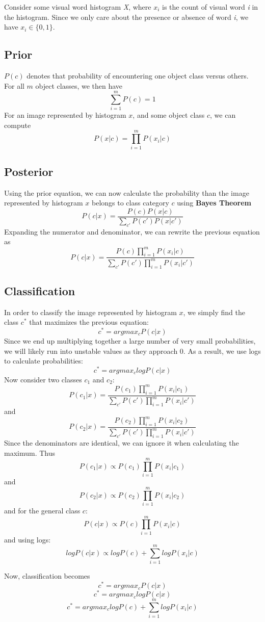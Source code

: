 \documentclass{article}
\begin{document}
Consider some visual word histogram \textit{X}, where $x_i$ is the count of visual word \textit{i} in the histogram. Since we only care about the presence or absence of word \textit{i}, we have $x_i \in \{0,1\}$.  
\subsection{Prior}
$P(c)$ denotes that probability of encountering one object class versus others. For all $m$ object classes, we then have $$\sum_{i=1}^m P(c)=1$$ For an image represented by histogram $x$, and some object class $c$, we can compute $$P(x|c) = \prod_{i=1}^m P(x_i|c)$$
\subsection{Posterior}
Using the prior equation, we can now calculate the probability than the image represented by histogram $x$ belongs to class category $c$ using \textbf{Bayes Theorem} $$P(c|x) = \frac{P(c)P(x|c)}{\sum_{c'}P(c')P(x|c')}$$
Expanding the numerator and denominator, we can rewrite the previous equation as 
$$P(c|x) = \frac{P(c)\prod_{i=1}^mP(x_i|c)}{\sum_{c'}P(c')\prod_{i=1}^mP(x_i|c')}$$
\subsection{Classification}
In order to classify the image represented by histogram $x$, we simply find the class $c^*$ that maximizes the previous equation:
$$c^*=arg{max}_{c}P(c|x)$$
Since we end up multiplying together a large number of very small probabilities, we will likely run into unstable values as they approach 0. As a result, we use logs to calculate probabilities:
$$c^*=arg{max}_{c}logP(c|x)$$
Now consider two classes $c_1$ and $c_2$:
$$P(c_1|x) = \frac{P(c_1)\prod_{i=1}^mP(x_i|c_1)}{\sum_{c'}P(c')\prod_{i=1}^mP(x_i|c')}$$
and
$$P(c_2|x) = \frac{P(c_2)\prod_{i=1}^mP(x_i|c_2)}{\sum_{c'}P(c')\prod_{i=1}^mP(x_i|c')}$$
Since the denominators are identical, we can ignore it when calculating the maximum. Thus
$$P(c_1|x) \propto P(c_1)\prod_{i=1}^mP(x_i|c_1)$$
and
$$P(c_2|x) \propto P(c_2)\prod_{i=1}^mP(x_i|c_2)$$
and for the general class $c$:
$$P(c|x) \propto P(c)\prod_{i=1}^mP(x_i|c)$$
and using logs:
$$logP(c|x) \propto logP(c)+\sum_{i=1}^mlogP(x_i|c)$$

Now, classification becomes 
$$c^*=arg{max}_{c}P(c|x)$$
$$c^*=arg{max}_{c}logP(c|x)$$
$$c^*=arg{max}_{c}logP(c)+\sum_{i=1}^mlogP(x_i|c)$$

{\small


}
\end{document}

